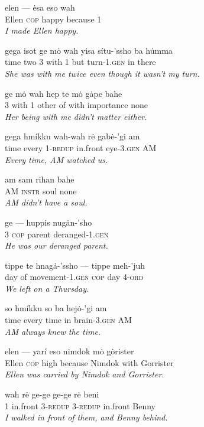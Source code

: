 \documentclass{article}[10pt]
\begin{document}
\begin{exe}
\ex
\gll elen --- \.{e}sa eso wah\\
Ellen \textsc{cop} happy because 1\\
\trans \emph{I made Ellen happy.}

\ex
\gll gega isot ge m\.{o} wah yisa s\'{i}tu-'ssho ba h\.{u}mma\\
time two 3 with 1 but turn-1.\textsc{gen} in there\\
\trans \emph{She was with me twice even though it wasn't my turn.}

\ex
\gll ge m\.{o} wah hep te m\.{o} g\.{a}pe bahe\\
3 with 1 other of with importance none\\
\trans \emph{Her being with me didn't matter either.}

\ex
\gll gega hm\'{i}kku wah-wah r\.{e} gab\.{e}-'gi am\\
time every 1-\textsc{redup} in.front eye-3.\textsc{gen} AM\\
\trans \emph{Every time, AM watched us.}

\ex
\gll am sam rihan bahe\\
AM \textsc{instr} soul none\\
\trans \emph{AM didn't have a soul.}

\ex
\gll ge --- huppis nug\.{a}n-'sho\\
3 \textsc{cop} parent deranged-1.\textsc{gen}\\
\trans \emph{He was our deranged parent.}


\ex
\gll tippe te hnag\.{a}-'ssho --- tippe meh-'juh\\
day of movement-1.\textsc{gen} \textsc{cop} day 4-\textsc{ord}\\
\trans \emph{We left on a Thursday.}

\ex
\gll so hm\'{i}kku so ba hej\.{o}-'gi am\\
time every time in brain-3.\textsc{gen} AM\\
\trans \emph{AM always knew the time.}


\ex
\gll elen --- yar\'{i} eso nimdok m\.{o} g\.{o}rister\\
Ellen \textsc{cop} high because Nimdok with Gorrister\\
\trans \emph{Ellen was carried by Nimdok and Gorrister.}

\ex
\gll wah r\.{e} ge-ge ge-ge r\.{e} beni\\
1 in.front 3-\textsc{redup} 3-\textsc{redup} in.front Benny\\
\trans \emph{I walked in front of them, and Benny behind.}


\end{exe}
\end{document}
